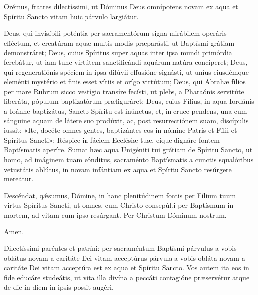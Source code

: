 
Orémus, fratres dilectíssimi, ut Dóminus Deus omnípotens novam ex aqua et
Spíritu Sancto vitam huic párvulo largiátur.


Deus,
qui invisíbili poténtia
per sacramentórum signa mirábilem operáris efféctum,
et creatúram aquæ multis modis præparásti,
ut Baptísmi grátiam demonstráret;
Deus, cuius Spíritus
super aquas inter ipsa mundi primórdia ferebátur,
ut iam tunc virtútem sanctificándi aquárum natúra concíperet;
Deus, qui regeneratiónis spéciem
in ipsa dilúvii effusióne signásti,
ut uníus eiusdémque eleménti mystério
et finis esset vítiis et orígo virtútum;
Deus, qui Abrahæ fílios
per mare Rubrum sicco vestígio transíre fecísti,
ut plebs, a Pharaónis servitúte liberáta,
pópulum baptizatórum præfiguráret;
Deus, cuius Fílius, in aqua Iordánis a Ioánne baptizátus,
Sancto Spíritu est inúnctus,
et, in cruce pendens,
una cum sánguine aquam de látere suo prodúxit,
ac, post resurrectiónem suam, discípulis iussit:
«Ite, docéte omnes gentes,
baptizántes eos in nómine Patris et Fílii et Spíritus Sancti»:
Réspice in fáciem Ecclésiæ tuæ,
eíque dignáre fontem Baptísmatis aperíre.
Sumat hæc aqua Unigéniti tui grátiam de Spíritu Sancto,
ut homo, ad imáginem tuam cónditus,
sacraménto Baptísmatis
a cunctis squalóribus vetustátis ablútus,
in novam infántiam
ex aqua et Spíritu Sancto resúrgere mereátur.


Descéndat, qǽsumus, Dómine,
in hanc plenitúdinem fontis
per Fílium tuum virtus Spíritus Sancti,
ut omnes, cum Christo consepúlti
per Baptísmum in mortem,
ad vitam cum ipso resúrgant.
Per Christum Dóminum nostrum.

 Amen.



Dilectíssimi paréntes et patríni: per sacraméntum Baptísmi
\ifparvulus
párvulus a vobis oblátus novam a caritáte Dei vitam acceptúrus
\else
párvula a vobis obláta novam a caritáte Dei vitam acceptúra
\fi
est ex aqua et Spíritu Sancto.
Vos autem ita eos in fide educáre studeátis, ut vita illa divína a peccáti
contagióne præservétur atque de die in diem in ipsis possit augéri.

